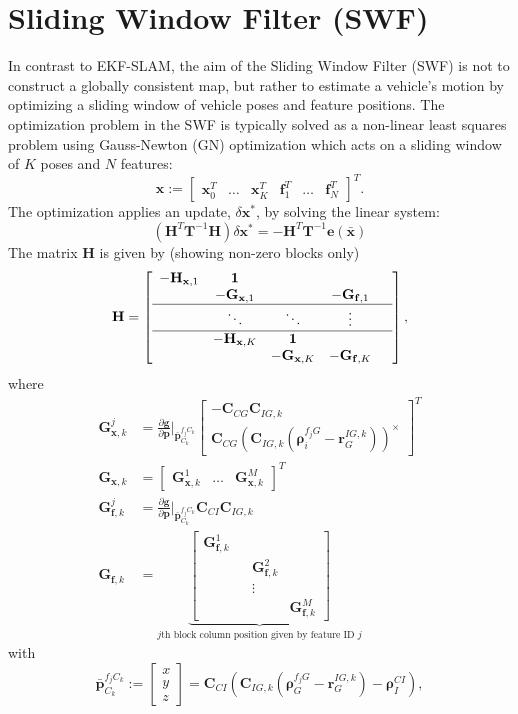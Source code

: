 \documentclass[letterpaper, 10 pt, conference]{ieeeconf}  %
\def\Vec#1{\mathbf{#1}}
\newcommand{\bbm}{\begin{bmatrix}}
\newcommand{\ebm}{\end{bmatrix}}
\newcommand{\pd}[2]{\frac{\partial #1}{\partial #2}}
\begin{document}
\section{Sliding Window Filter (SWF)} \label{sec:SWF}
In contrast to EKF-SLAM, the aim of the Sliding Window Filter (SWF) is not to construct a globally consistent map, but rather to estimate a vehicle's motion by optimizing a sliding window of vehicle poses and feature positions.
The optimization problem in the SWF is typically solved as a non-linear least squares problem using Gauss-Newton (GN) optimization which acts on a sliding window of $K$ poses and $N$ features: 
\begin{equation}
\Vec{x} := \bbm \Vec x_0^T & \hdots & \Vec x_K^T & \Vec f_1^T & \hdots & \Vec f_N^T\ebm ^T.
\end{equation}
The optimization applies an update, $ \delta \Vec{x}^*$, by solving the linear system:
\begin{equation}
(\Vec H^T \Vec T ^{-1} \Vec H ) \delta \Vec{x}^*  = - \Vec{H}^T\Vec{T}^{-1}\Vec{e}(\bar{\Vec{x}})
\end{equation}
The matrix $\Vec{H}$ is given by (showing non-zero blocks only)
\begin{equation}
\mathbf{H} = \left[\begin{array}{cccccc}
 -\Vec H_{\Vec x, 1} & \Vec 1 & & &   \\ 
 & -\Vec G_{\Vec x, 1} &  &   -\Vec G_{\Vec f, 1} \\ \hline
 & \ddots & \ddots & \vdots  \\  \hline
 & -\Vec H_{\Vec x, K} & \Vec 1 & \\ 
 & & -\Vec G_{\Vec x, K} &  -\Vec G_{\Vec f, K}   \\  
\end{array}\right], 
\end{equation}
where
\begin{align}
\Vec G_{\Vec{x}, k}^j &= \pd{\Vec g}{ \Vec p}\Bigr|_{\bar{\Vec p}_{C_k}^{f_j C_k}}
    \bbm -\Vec C_{CG} \Vec C_{IG,k} \\[0.5em] \Vec C_{CG} (\Vec C_{IG,k} (\boldsymbol{\rho}_i^{f_j G} - \Vec r_G^{IG,k} ) )^\times  \ebm ^T
\\[0.5em]
\Vec G_{\Vec x, k} &= \bbm \Vec G_{\Vec x, k}^1 & \hdots & \Vec G_{\Vec x, k}^M \ebm ^T
\\[0.5em]
\Vec G_{\Vec f, k}^j &= \pd{\Vec g}{ \Vec p}\Bigr|_{\bar{\Vec p}_{C_k}^{f_j C_k}} \Vec C_{CI} \Vec C_{IG,k}
\\[0.5em]
\Vec G_{\Vec f, k} &= \underbrace{\bbm \Vec G_{\Vec f, k}^1 & & \\ & & \Vec G_{\Vec f, k}^2 & \\ & & \vdots &  \\ & & & \Vec G_{\Vec f, k}^M \ebm}_{\text{$j$th block column position given by feature ID $j$}}
\end{align}
with
\begin{equation}
\bar{\Vec p}_{C_k}^{f_j C_k} := \bbm x \\ y \\ z \ebm = \Vec C_{CI} \left( \Vec C_{IG,k} (\boldsymbol{\rho}_G^{f_j G} - \Vec r_G^{IG,k} )   - \boldsymbol \rho_I^{CI} \right),
\end{equation}
\end{document}
